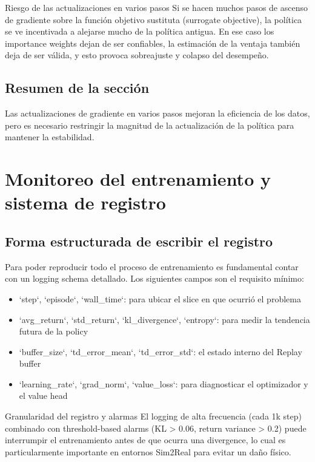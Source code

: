 \documentclass[a4paper]{article}
\begin{document}
\begin{warningbox}{Riesgo de las actualizaciones en varios pasos}
Si se hacen muchos pasos de ascenso de gradiente sobre la función objetivo sustituta (surrogate objective), la política se ve incentivada a alejarse mucho de la política antigua. En ese caso los importance weights dejan de ser confiables, la estimación de la ventaja también deja de ser válida, y esto provoca sobreajuste y colapso del desempeño.
\end{warningbox}

\subsection{Resumen de la sección}

Las actualizaciones de gradiente en varios pasos mejoran la eficiencia de los datos, pero es necesario restringir la magnitud de la actualización de la política para mantener la estabilidad.

\section{Monitoreo del entrenamiento y sistema de registro}

\subsection{Forma estructurada de escribir el registro}

Para poder reproducir todo el proceso de entrenamiento es fundamental contar con un logging schema detallado. Los siguientes campos son el requisito mínimo:

\begin{itemize}
    \item `step`, `episode`, `wall_time`: para ubicar el slice en que ocurrió el problema
    \item `avg_return`, `std_return`, `kl_divergence`, `entropy`: para medir la tendencia futura de la policy
    \item `buffer_size`, `td_error_mean`, `td_error_std`: el estado interno del Replay buffer
    \item `learning_rate`, `grad_norm`, `value_loss`: para diagnosticar el optimizador y el value head
\end{itemize}

\begin{importantbox}{Granularidad del registro y alarmas}
El logging de alta frecuencia (cada 1k step) combinado con threshold-based alarms (KL > 0.06, return variance > 0.2) puede interrumpir el entrenamiento antes de que ocurra una divergence, lo cual es particularmente importante en entornos Sim2Real para evitar un daño físico.
\end{importantbox}
\end{document}
